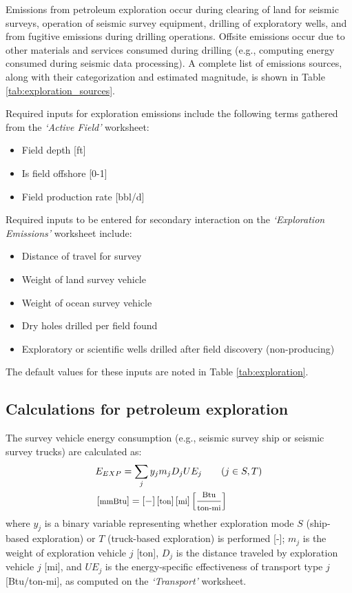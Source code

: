 \documentclass[11pt]{report}
\newcommand{\marg}[1]{{\footnotesize\textit{\textcolor{stanford}{'#1'}}}}
\newcommand{\marginnote}[1]{\marginpar{\marg{#1}}}
\newcommand{\sheet}[1]{\textit{`{#1}'}}
\begin{document}
Emissions from petroleum exploration occur during clearing of land for seismic surveys, operation of seismic survey equipment, drilling of exploratory wells, and from fugitive emissions during drilling operations. Offsite emissions occur due to other materials and services consumed during drilling (e.g., computing energy consumed during seismic data processing). A complete list of emissions sources, along with their categorization and estimated magnitude, is shown in Table \ref{tab:exploration_sources}.

Required inputs for exploration emissions include the following terms gathered from the \sheet{Active Field} worksheet:\marginnote{Exploration 1.1}
\begin{itemize}
\item Field depth [ft]
\item Is field offshore [0-1]
\item Field production rate [bbl/d]
\end{itemize}

Required inputs to be entered for secondary interaction on the \sheet{Exploration Emissions} worksheet include:\marginnote{Exploration 1.2.1 - 1.2.5}
\begin{itemize}
\item Distance of travel for survey
\item Weight of land survey vehicle
\item Weight of ocean survey vehicle
\item Dry holes drilled per field found
\item Exploratory or scientific wells drilled after field discovery (non-producing)
\end{itemize}
The default values for these inputs are noted in Table \ref{tab:exploration}.

\subsection{Calculations for petroleum exploration}

The survey vehicle energy consumption (e.g., seismic survey ship or seismic survey trucks) are calculated as:
\begin{equation}\label{eq:trans_Etr}
\begin{split}
& E_{EXP} = \sum_{j} y_j m_j D_{j} UE_{j} \quad\quad (j \in S,T) \\
& \begin{footnotesize} \left[ \text{mmBtu} \right] =\left[- \right]  \left[\text{ton} \right]  \left[ \text{mi} \right] \left[ \frac{\text{Btu}}{\text{ton-mi}} \right] 
\end{footnotesize}
\end{split}
\end{equation}
where $y_j$ is a binary variable representing whether exploration mode $S$ (ship-based exploration) or $T$ (truck-based exploration) is performed [-]; $m_j$ is the weight of exploration vehicle $j$ [ton], $D_j$ is the distance traveled by exploration vehicle $j$ [mi], and $UE_{j}$ is the energy-specific effectiveness of transport type $j$ [Btu/ton-mi], as computed on the \sheet{Transport} worksheet.\marginnote{Transport 2.2}
\end{document}
